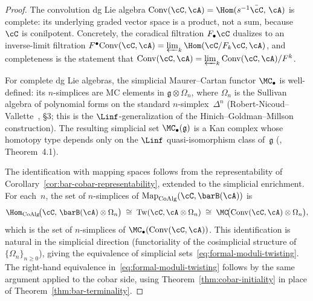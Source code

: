 \begin{proof}
The convolution dg Lie algebra
$\mathrm{Conv}(\cC, \cA)
= \Hom(s^{-1}\bar{\cC},\, \cA)$
is complete: its underlying graded vector space is a product, not
a sum, because $\cC$ is conilpotent. Concretely, the coradical
filtration $F_\bullet\cC$ dualizes to an inverse-limit filtration
$F^\bullet\mathrm{Conv}(\cC, \cA)
= \varprojlim_k \Hom(\cC/F_k\cC, \cA)$, and completeness is the
statement that $\mathrm{Conv}(\cC, \cA)
= \varprojlim_k \mathrm{Conv}(\cC, \cA)/F^k$.

For complete dg Lie algebras, the simplicial Maurer--Cartan functor
$\MC_\bullet$ is well-defined: its $n$-simplices are MC elements
in $\mathfrak{g} \otimes \Omega_n$, where $\Omega_n$ is the
Sullivan algebra of polynomial forms on the standard
$n$-simplex~$\Delta^n$
(Robert-Nicoud--Vallette~\cite{RNV20}, \S3; this is the
$\Linf$-generalization of the Hinich--Goldman--Millson
construction). The resulting simplicial set
$\MC_\bullet(\mathfrak{g})$
is a Kan complex whose homotopy type depends only on the
$\Linf$ quasi-isomorphism class of~$\mathfrak{g}$
(\cite{RNV20}, Theorem~4.1).

The identification with mapping spaces follows from the
representability of
Corollary~\ref{cor:bar-cobar-representability}, extended to the
simplicial enrichment. For each~$n$, the set of
$n$-simplices of
$\mathrm{Map}_{\mathrm{CoAlg}}(\cC, \barB(\cA))$ is
\[
\Hom_{\mathrm{CoAlg}}\!\bigl(\cC,\,
 \barB(\cA) \otimes \Omega_n\bigr)
\;\cong\;
\mathrm{Tw}(\cC, \cA \otimes \Omega_n)
\;\cong\;
\MC\!\bigl(\mathrm{Conv}(\cC, \cA) \otimes \Omega_n\bigr),
\]
which is the set of $n$-simplices of
$\MC_\bullet(\mathrm{Conv}(\cC, \cA))$.
This identification is natural in the simplicial direction
(functoriality of the cosimplicial structure of
$\{\Omega_n\}_{n \geq 0}$), giving the equivalence of simplicial
sets~\eqref{eq:formal-moduli-twisting}. The right-hand equivalence
in~\eqref{eq:formal-moduli-twisting} follows by the same argument
applied to the cobar side, using
Theorem~\ref{thm:cobar-initiality} in place of
Theorem~\ref{thm:bar-terminality}.


\end{proof}
